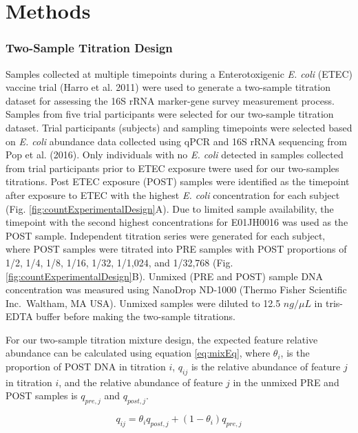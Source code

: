 \documentclass[smallextended]{svjour3}       %
\begin{document}
\hypertarget{methods}{%
\section{Methods}\label{methods}}

\hypertarget{two-sample-titration-design}{%
\subsubsection{Two-Sample Titration
Design}\label{two-sample-titration-design}}

Samples collected at multiple timepoints during a Enterotoxigenic
\emph{E. coli} (ETEC) vaccine trial (Harro et al. 2011) were used to
generate a two-sample titration dataset for assessing the 16S rRNA
marker-gene survey measurement process. Samples from five trial
participants were selected for our two-sample titration dataset. Trial
participants (subjects) and sampling timepoints were selected based on
\emph{E. coli} abundance data collected using qPCR and 16S rRNA
sequencing from Pop et al. (2016). Only individuals with no \emph{E.
coli} detected in samples collected from trial participants prior to
ETEC exposure twere used for our two-samples titrations. Post ETEC
exposure (POST) samples were identified as the timepoint after exposure
to ETEC with the highest \emph{E. coli} concentration for each subject
(Fig. \ref{fig:countExperimentalDesign}A). Due to limited sample
availability, the timepoint with the second highest concentrations for
E01JH0016 was used as the POST sample. Independent titration series were
generated for each subject, where POST samples were titrated into PRE
samples with POST proportions of 1/2, 1/4, 1/8, 1/16, 1/32, 1/1,024, and
1/32,768 (Fig. \ref{fig:countExperimentalDesign}B). Unmixed (PRE and
POST) sample DNA concentration was measured using NanoDrop ND-1000
(Thermo Fisher Scientific Inc.~Waltham, MA USA). Unmixed samples were
diluted to 12.5 \(ng/\mu L\) in tris-EDTA buffer before making the
two-sample titrations.

For our two-sample titration mixture design, the expected feature
relative abundance can be calculated using equation \eqref{eq:mixEq},
where \(\theta_i\), is the proportion of POST DNA in titration \(i\),
\(q_{ij}\) is the relative abundance of feature \(j\) in titration
\(i\), and the relative abundance of feature \(j\) in the unmixed PRE
and POST samples is \(q_{pre,j}\) and \(q_{post,j}\).

\begin{equation}
  q_{ij} = \theta_i q_{post,j} + (1 - \theta_i) q_{pre,j}
  \label{eq:mixEq}
\end{equation}
\end{document}

